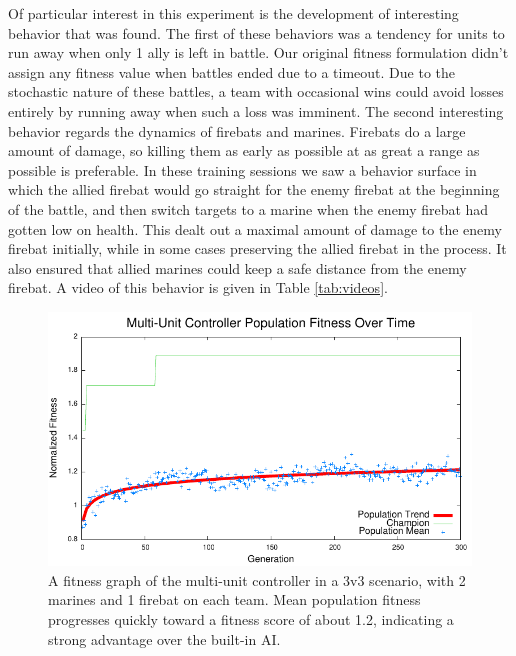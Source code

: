 \documentclass[10pt,a4paper,twocolumn]{article}
\begin{document}
Of particular interest in this experiment is the development of interesting behavior that was found. The first of these behaviors was a tendency for units to run away when only 1 ally is left in battle. Our original fitness formulation didn't assign any fitness value when battles ended due to a timeout. Due to the stochastic nature of these battles, a team with occasional wins could avoid losses entirely by running away when such a loss was imminent. The second interesting behavior regards the dynamics of firebats and marines. Firebats do a large amount of damage, so killing them as early as possible at as great a range as possible is preferable. In these training sessions we saw a behavior surface in which the allied firebat would go straight for the enemy firebat at the beginning of the battle, and then switch targets to a marine when the enemy firebat had gotten low on health. This dealt out a maximal amount of damage to the enemy firebat initially, while in some cases preserving the allied firebat in the process. It also ensured that allied marines could keep a safe distance from the enemy firebat. A video of this behavior is given in Table \ref{tab:videos}.

\begin{figure}
\centering
\includegraphics[scale=.59]{plots/multiunit.pdf}
\caption{A fitness graph of the multi-unit controller in a 3v3 scenario, with 2 marines and 1 firebat on each team. Mean population fitness progresses quickly toward a fitness score of about 1.2, indicating a strong advantage over the built-in AI.}
\label{fig:multiunit_exp}
\end{figure}
\end{document}
